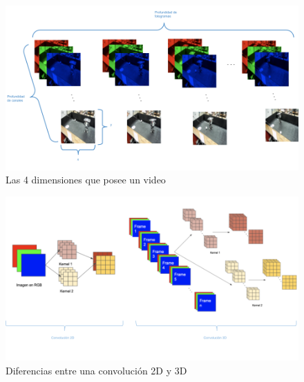 \begin{onehalfspacing}
\begin{figure}[p]
	\centering
	\includegraphics[width=13cm,keepaspectratio]{XX_Figures/Fig_Video.png}
	\caption{\footnotesize Las 4 dimensiones que posee un video}
	\label{fig:Fig_Video}
\end{figure}

\begin{figure}[p]
	\centering
	\includegraphics[width=13cm,keepaspectratio]{XX_Figures/Fig_CNN_2Dvs3D.png}
	\caption{\footnotesize Diferencias entre una convolución 2D y 3D}
	\label{fig:Fig_CNN_2Dvs3D}
\end{figure}


\end{onehalfspacing}
